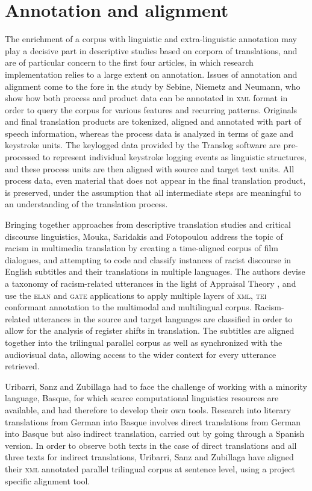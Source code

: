 \documentclass[output=paper]{LSP/langsci}
\begin{document}
\section{Annotation and alignment} 
The enrichment of a corpus with linguistic and extra-linguistic annotation may play a decisive part in descriptive studies based on corpora of translations, and are of particular concern to the first four articles, in which research implementation relies to a large extent on annotation. Issues of annotation and alignment come to the fore in the study by Sebine, Niemetz and Neumann, who show how both process and product data can be annotated in \textsc{xml} format in order to query the corpus for various features and recurring patterns. Originals and final translation products are tokenized, aligned and annotated with part of speech information, whereas the process data is analyzed in terms of gaze and keystroke units. The keylogged data provided by the Translog software are pre-processed to represent individual keystroke logging events as linguistic structures, and these process units are then aligned with source and target text units. All process data, even material that does not appear in the final translation product, is preserved, under the assumption that all intermediate steps are meaningful to an understanding of the translation process. 

Bringing together approaches from descriptive translation studies and critical discourse linguistics, Mouka, Saridakis and Fotopoulou address the topic of racism in multimedia translation by creating a time-aligned corpus of film dialogues, and attempting to code and classify instances of racist discourse in English subtitles and their translations in multiple languages. The authors devise a taxonomy of racism-related utterances in the light of Appraisal Theory \citep{MartinWhite2005}, and use the \textsc{elan} and \textsc{gate} applications to apply multiple layers of \textsc{xml}, \textsc{tei} conformant annotation to the multimodal and multilingual corpus. Racism-related utterances in the source and target languages are classified in order to allow for the analysis of register shifts in translation. The subtitles are aligned together into the trilingual parallel corpus as well as synchronized with the audiovisual data, allowing access to the wider context for every utterance retrieved. 

Uribarri, Sanz and Zubillaga had to face the challenge of working with a minority language, Basque, for which scarce computational linguistics resources are available, and had therefore to develop their own tools. Research into literary translations from German into Basque involves direct translations from German into Basque but also indirect translation, carried out by going through a Spanish version. In order to observe both texts in the case of direct translations and all three texts for indirect translations, Uribarri, Sanz and Zubillaga have aligned their \textsc{xml} annotated parallel trilingual corpus at sentence level, using a project specific alignment tool.
\end{document}
